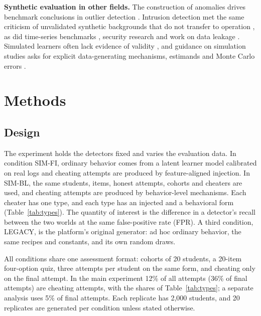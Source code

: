\documentclass[conference,a4paper]{IEEEtran}
\begin{document}
\textbf{Synthetic evaluation in other fields.} The construction of anomalies drives benchmark conclusions in outlier detection \cite{emmott2013benchmarks}. Intrusion detection met the same criticism of unvalidated synthetic backgrounds that do not transfer to operation \cite{mchugh2000testing,sommer2010outside}, as did time-series benchmarks \cite{wu2023benchmarks}, security research \cite{arp2022dos} and work on data leakage \cite{kapoor2023leakage}. Simulated learners often lack evidence of validity \cite{kaser2024simulated}, and guidance on simulation studies asks for explicit data-generating mechanisms, estimands and Monte Carlo errors \cite{morris2019simulation}.

\section{Methods}
\subsection{Design}
The experiment holds the detectors fixed and varies the evaluation data. In condition SIM-FI, ordinary behavior comes from a latent learner model calibrated on real logs and cheating attempts are produced by feature-aligned injection. In SIM-BL, the same students, items, honest attempts, cohorts and cheaters are used, and cheating attempts are produced by behavior-level mechanisms. Each cheater has one type, and each type has an injected and a behavioral form (Table~\ref{tab:types}). The quantity of interest is the difference in a detector's recall between the two worlds at the same false-positive rate (FPR). A third condition, LEGACY, is the platform's original generator: ad hoc ordinary behavior, the same recipes and constants, and its own random draws.

All conditions share one assessment format: cohorts of 20 students, a 20-item four-option quiz, three attempts per student on the same form, and cheating only on the final attempt. In the main experiment 12\% of all attempts (36\% of final attempts) are cheating attempts, with the shares of Table~\ref{tab:types}; a separate analysis uses 5\% of final attempts. Each replicate has 2,000 students, and 20 replicates are generated per condition unless stated otherwise.
\end{document}
